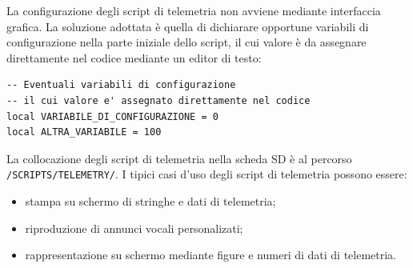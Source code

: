 \documentclass[a4paper, 12pt]{report}
\begin{document}
La configurazione degli script di telemetria non avviene mediante interfaccia grafica. La soluzione adottata è quella di dichiarare opportune variabili di configurazione nella parte iniziale dello script, il cui valore è da assegnare direttamente nel codice mediante un editor di testo:

\begin{lstlisting}
-- Eventuali variabili di configurazione
-- il cui valore e' assegnato direttamente nel codice
local VARIABILE_DI_CONFIGURAZIONE = 0
local ALTRA_VARIABILE = 100
\end{lstlisting}

La collocazione degli script di telemetria nella scheda SD è al percorso \texttt{/SCRIPTS/TELEMETRY/}. 
I tipici casi d'uso degli script di telemetria possono essere:
\begin{itemize}
        \item stampa su schermo di stringhe e dati di telemetria;
        \item riproduzione di annunci vocali personalizati;
        \item rappresentazione su schermo mediante figure e numeri di dati di telemetria.
\end{itemize}
\end{document}
